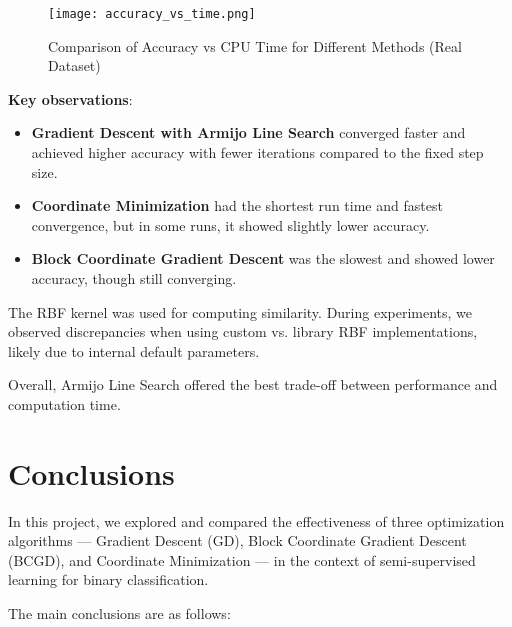 \documentclass{article}
\begin{document}
\begin{figure}[h]
    \centering
    \texttt{[image: accuracy\_vs\_time.png]} %
    \caption{Comparison of Accuracy vs CPU Time for Different Methods (Real Dataset)}
    \label{fig:real_data_results}
\end{figure}

\noindent \textbf{Key observations}:
\begin{itemize}
    \item \textbf{Gradient Descent with Armijo Line Search} converged faster and achieved higher accuracy with fewer iterations compared to the fixed step size.
    \item \textbf{Coordinate Minimization} had the shortest run time and fastest convergence, but in some runs, it showed slightly lower accuracy.
    \item \textbf{Block Coordinate Gradient Descent} was the slowest and showed lower accuracy, though still converging.
\end{itemize}

\noindent The RBF kernel was used for computing similarity. During experiments, we observed discrepancies when using custom vs. library RBF implementations, likely due to internal default parameters.

\noindent Overall, Armijo Line Search offered the best trade-off between performance and computation time.


\section{Conclusions}

In this project, we explored and compared the effectiveness of three optimization algorithms — Gradient Descent (GD), Block Coordinate Gradient Descent (BCGD), and Coordinate Minimization — in the context of semi-supervised learning for binary classification.

\noindent The main conclusions are as follows:
\end{document}
